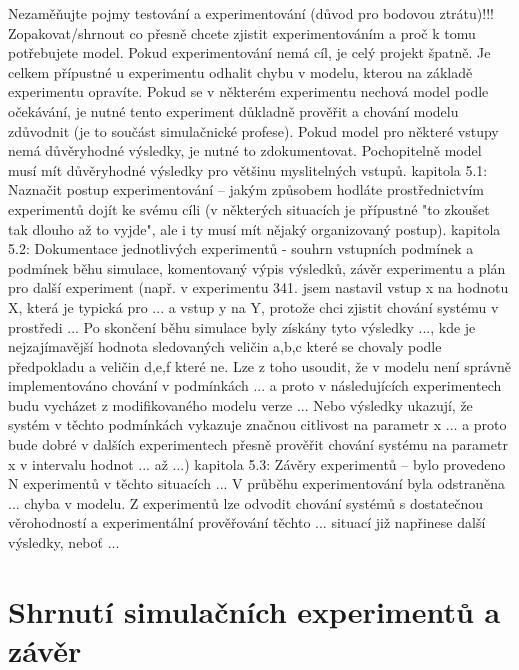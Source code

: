 \documentclass[a4paper,11pt]{article}
\begin{document}
Nezaměňujte pojmy testování a experimentování (důvod pro bodovou ztrátu)!!!
Zopakovat/shrnout co přesně chcete zjistit experimentováním a proč k tomu potřebujete model. Pokud experimentování nemá cíl, je celý projekt špatně. Je celkem přípustné u experimentu odhalit chybu v modelu, kterou na základě experimentu opravíte. Pokud se v některém experimentu nechová model podle očekávání, je nutné tento experiment důkladně prověřit a chování modelu zdůvodnit (je to součást simulačnické profese). Pokud model pro některé vstupy nemá důvěryhodné výsledky, je nutné to zdokumentovat. Pochopitelně model musí mít důvěryhodné výsledky pro většinu myslitelných vstupů.
kapitola 5.1: Naznačit postup experimentování – jakým způsobem hodláte prostřednictvím experimentů dojít ke svému cíli (v některých situacích je přípustné "to zkoušet tak dlouho až to vyjde", ale i ty musí mít nějaký organizovaný postup).
kapitola 5.2: Dokumentace jednotlivých experimentů - souhrn vstupních podmínek a podmínek běhu simulace, komentovaný výpis výsledků, závěr experimentu a plán pro další experiment (např. v experimentu 341. jsem nastavil vstup x na hodnotu X, která je typická pro ... a vstup y na Y, protože chci zjistit chování systému v prostředi ... Po skončení běhu simulace byly získány tyto výsledky ..., kde je nejzajímavější hodnota sledovaných veličin a,b,c které se chovaly podle předpokladu a veličin d,e,f které ne. Lze z toho usoudit, že v modelu není správně implementováno chování v podmínkách ... a proto v následujících experimentech budu vycházet z modifikovaného modelu verze ... Nebo výsledky ukazují, že systém v těchto podmínkách vykazuje značnou citlivost na parametr x ... a proto bude dobré v dalších experimentech přesně prověřit chování systému na parametr x v intervalu hodnot ... až ...)
kapitola 5.3: Závěry experimentů – bylo provedeno N experimentů v těchto situacích ... V průběhu experimentování byla odstraněna ... chyba v modelu. Z experimentů lze odvodit chování systémů s dostatečnou věrohodností a experimentální prověřování těchto ... situací již napřinese další výsledky, neboť ...


\section{Shrnutí simulačních experimentů a závěr}
\end{document}

